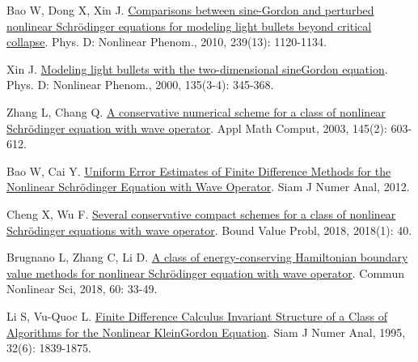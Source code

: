 \begin{thebibliography}{77}
    Bao W, Dong X, Xin J.
    \newblock \href{https://linkinghub.elsevier.com/retrieve/pii/S0167278910000965}{Comparisons between sine-{{Gordon}} and perturbed nonlinear {{Schr{\"o}dinger}} equations for modeling light bullets beyond critical collapse}\allowbreak[J].
    \newblock Phys. D: Nonlinear Phenom., 2010, 239\allowbreak (13): 1120-1134.
    
    Xin J.
    \newblock \href{https://linkinghub.elsevier.com/retrieve/pii/S0167278999001281}{Modeling light bullets with the two-dimensional sine{\textendash}{{Gordon}} equation}\allowbreak[J].
    \newblock Phys. D: Nonlinear Phenom., 2000, 135\allowbreak (3-4): 345-368.
    
    Zhang L, Chang Q.
    \newblock \href{https://www.sciencedirect.com/science/article/pii/S0096300302008421}{A conservative numerical scheme for a class of nonlinear {{Schr{\"o}dinger}} equation with wave operator}\allowbreak[J].
    \newblock Appl Math Comput, 2003, 145\allowbreak (2): 603-612.
    
    Bao W, Cai Y.
    \newblock \href{https://epubs.siam.org/doi/10.1137/110830800}{Uniform {{Error Estimates}} of {{Finite Difference Methods}} for the {{Nonlinear Schr{\"o}dinger Equation}} with {{Wave Operator}}}\allowbreak[J].
    \newblock Siam J Numer Anal, 2012.
    
    Cheng X, Wu F.
    \newblock \href{https://boundaryvalueproblems.springeropen.com/articles/10.1186/s13661-018-0956-4}{Several conservative compact schemes for a class of nonlinear {{Schr{\"o}dinger}} equations with wave operator}\allowbreak[J].
    \newblock Bound Value Probl, 2018, 2018\allowbreak (1): 40.
    
    Brugnano L, Zhang C, Li D.
    \newblock \href{https://linkinghub.elsevier.com/retrieve/pii/S1007570417304409}{A class of energy-conserving {{Hamiltonian}} boundary value methods for nonlinear {{Schr{\"o}dinger}} equation with wave operator}\allowbreak[J].
    \newblock Commun Nonlinear Sci, 2018, 60: 33-49.
    
    Li S, {Vu-Quoc} L.
    \newblock \href{https://epubs.siam.org/doi/10.1137/0732083}{Finite {{Difference Calculus Invariant Structure}} of a {{Class}} of {{Algorithms}} for the {{Nonlinear Klein}}{\textendash}{{Gordon Equation}}}\allowbreak[J].
    \newblock Siam J Numer Anal, 1995, 32\allowbreak (6): 1839-1875.
    

\end{thebibliography}
